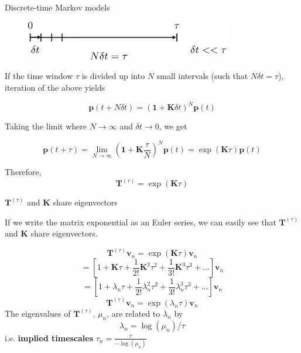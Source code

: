 \documentclass{beamer}
\begin{document}
\begin{frame}{Discrete-time Markov models}

\begin{figure}
\includegraphics[width=0.8\textwidth]{tau-chopped}
\end{figure}

If the time window $\tau$ is divided up into $N$  small intervals (such that $N \delta t = \tau$), iteration of the above  yields

$$\mathbf{p}(t+N\delta t) = (\mathbf{1} + \mathbf{K} \delta t)^N\mathbf{p}(t)$$

Taking the limit where $N \rightarrow \infty$ and $\delta t \rightarrow 0$, we get

$$\mathbf{p}(t+\tau) = \lim_{N \rightarrow \infty} (\mathbf{1} + \mathbf{K} \frac{\tau}{N})^N\mathbf{p}(t) = \exp(\mathbf{K}\tau)\mathbf{p}(t)$$

Therefore,
$$\mathbf{T}^{(\tau)} = \exp(\mathbf{K}\tau)$$

\end{frame}


\begin{frame}{$\mathbf{T}^{(\tau)}$ and $\mathbf{K}$ share eigenvectors }

If we write the matrix exponential as an Euler series, we can easily see that $\mathbf{T}^{(\tau)}$ and $\mathbf{K}$ share eigenvectors.  

$$\mathbf{T}^{(\tau)}\mathbf{v}_n = \exp(\mathbf{K}\tau) \mathbf{v}_n$$
$$= [1 + \mathbf{K}\tau + \frac{1}{2!}\mathbf{K}^2\tau^2 + \frac{1}{3!}\mathbf{K}^3\tau^3 + ...]  \mathbf{v}_n$$
$$= [1 + \lambda_n\tau + \frac{1}{2!}\lambda_n^2\tau^2 + \frac{1}{3!}\lambda_n^3\tau^3 + ...]  \mathbf{v}_n$$
$$ \mathbf{T}^{(\tau)}\mathbf{v}_n = \exp(\lambda_n \tau) \mathbf{v}_n$$
The eigenvalues of $ \mathbf{T}^{(\tau)}$, $\mu_n$, are related to $\lambda_n$ by
$$ \lambda_n = \log(\mu_n)/\tau$$
i.e. \textbf{implied timescales} $\boxed{ \tau_n = \frac{\tau}{-\log(\mu_n)}  }$
\end{frame}
\end{document}
